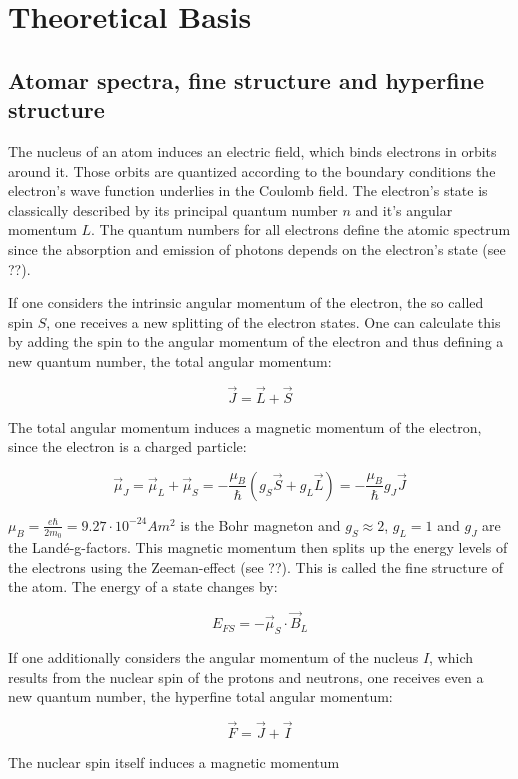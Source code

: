 \section{Theoretical Basis}

\subsection{Atomar spectra, fine structure and hyperfine structure}

The nucleus of an atom induces an electric field, which binds electrons in orbits around it. Those orbits are quantized according to the boundary conditions the electron's wave function underlies in the Coulomb field. The electron's state is classically described by its principal quantum number $n$ and it's angular momentum $L$. The quantum numbers for all electrons define the atomic spectrum since the absorption and emission of photons depends on the electron's state (see ??).

If one considers the intrinsic angular momentum of the electron, the so called spin $S$, one receives a new splitting of the electron states. One can calculate this by adding the spin to the angular momentum of the electron and thus defining a new quantum number, the total angular momentum:

$$ \vec J = \vec L + \vec S $$

The total angular momentum induces a magnetic momentum of the electron, since the electron is a charged particle:

$$\vec \mu_J = \vec \mu_L + \vec \mu_S = - \frac{\mu_B}{\hbar}(g_S\vec S + g_L\vec L) = -\frac{\mu_B}{\hbar}g_J\vec J$$

$\mu_B = \frac{e\hbar}{2m_0} = 9.27\cdot10^{-24}Am^2$ is the Bohr magneton and $g_S \approx 2$, $g_L = 1$ and $g_J$ are the Landé-g-factors. This magnetic momentum then splits up the energy levels of the electrons using the Zeeman-effect (see ??). This is called the fine structure of the atom. The energy of a state changes by:

$$ E_{FS} = -\vec\mu_S\cdot\vec B_L $$

If one additionally considers the angular momentum of the nucleus $I$, which results from the nuclear spin of the protons and neutrons, one receives even a new quantum number, the hyperfine total angular momentum:

$$ \vec F = \vec J + \vec I $$

The nuclear spin itself induces a magnetic momentum 

